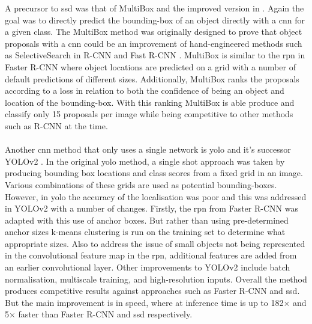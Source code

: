 A precursor to \gls{ssd} was that of MultiBox \cite{multibox1} and the improved version in \cite{multibox2}. Again the goal was to directly predict the bounding-box of an object directly with a \gls{cnn} for a given class. The MultiBox method was originally designed to prove that object proposals with a \gls{cnn} could be an improvement of hand-engineered methods such as SelectiveSearch \cite{selectivesearch} in R-CNN \cite{rcnn} and Fast R-CNN \cite{fastrcnn}. MultiBox is similar to the \gls{rpn} in Faster R-CNN \cite{fasterrcnn} where object locations are predicted on a grid with a number of default predictions of different sizes. Additionally, MultiBox ranks the proposals according to a loss in relation to both the confidence of being an object and location of the bounding-box. With this ranking MultiBox is able produce and classify only 15 proposals per image while being competitive to other methods such as R-CNN at the time.
\\\\
Another \gls{cnn} method that only uses a single network is \gls{yolo} \cite{yolo} and it's successor YOLOv2 \cite {yolov2}. In the original \gls{yolo} method, a single shot approach was taken by producing bounding box locations and class scores from a fixed grid in an image. Various combinations of these grids are used as potential bounding-boxes. However, in \gls{yolo} the accuracy of the localisation was poor and this was addressed in YOLOv2 with a number of changes. Firstly, the \gls{rpn} from Faster R-CNN \cite{fasterrcnn} was adapted with this use of anchor boxes. But rather than using pre-determined anchor sizes k-means clustering is run on the training set to determine what appropriate sizes. Also to address the issue of small objects not being represented in the convolutional feature map in the \gls{rpn}, additional features are added from an earlier convolutional layer. Other improvements to YOLOv2 include batch normalisation, multiscale training, and high-resolution inputs. Overall the method produces competitive results against approaches such as Faster R-CNN and \gls{ssd}. But the main improvement is in speed, where at inference time is up to 182$\times$ and 5$\times$ faster than Faster R-CNN and \gls{ssd} respectively.
\\\\
